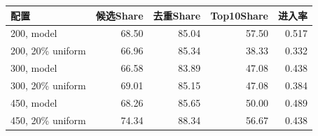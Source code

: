 \begin{tabular}{lrrrr}
\toprule
配置 & 候选Share & 去重Share & Top10Share & 进入率 \\
\midrule
200, model & 68.50 & 85.04 & 57.50 & 0.517 \\
200, 20\% uniform & 66.96 & 85.34 & 38.33 & 0.332 \\
300, model & 66.58 & 83.89 & 47.08 & 0.438 \\
300, 20\% uniform & 69.01 & 85.15 & 47.08 & 0.384 \\
450, model & 68.26 & 85.65 & 50.00 & 0.489 \\
450, 20\% uniform & 74.34 & 88.34 & 56.67 & 0.438 \\
\bottomrule
\end{tabular}
